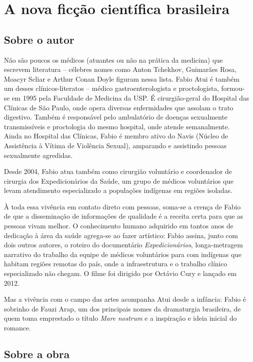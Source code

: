 \chapter{A nova ficção científica brasileira}

\section{Sobre o autor}


Não são poucos os médicos (atuantes ou não na prática da medicina) que escrevem literatura – célebres nomes como Anton Tchekhov, Guimarães Rosa, Moacyr Scliar e Arthur Conan Doyle figuram nessa lista. Fabio Atui é também um desses clínicos-literatos – médico gastroenterologista e proctologista, formou-se em 1995 pela Faculdade de Medicina da USP. É cirurgião-geral do Hospital das Clínicas de São Paulo, onde opera diversas enfermidades que assolam o trato digestivo. Também é responsável pelo ambulatório de doenças sexualmente transmissíveis e proctologia do mesmo hospital, onde atende semanalmente. Ainda no Hospital das Clínicas, Fabio é membro ativo do Navis (Núcleo de Assistência à Vítima de Violência Sexual), amparando e assistindo pessoas sexualmente agredidas.

Desde 2004, Fabio atua também como cirurgião voluntário e coordenador de cirurgia dos Expedicionários da Saúde, um grupo de médicos voluntários que levam atendimento especializado a populações indígenas em regiões isoladas. 

À toda essa vivência em contato direto com pessoas, soma-se a crença de Fabio de que a disseminação de informações de qualidade é a receita certa para que as pessoas vivam melhor. O conhecimento humano adquirido em tantos anos de dedicação à área da saúde agrega-se ao fazer artístico: Fabio assina, junto com dois outros autores, o roteiro do documentário \emph{Expedicionários}, longa-metragem narrativo do trabalho da equipe de médicos voluntários para com indígenas que habitam regiões remotas do país, onde a infraestrutura e o trabalho clínico especializado não chegam. O filme foi dirigido por Octávio Cury e lançado em 2012. 

Mas a vivência com o campo das artes acompanha Atui desde a infância: Fabio é sobrinho de Fauzi Arap, um dos principais nomes da dramaturgia brasileira, de quem toma emprestado o título \emph{Mare nostrum} e a inspiração e ideia inicial do romance.

\section{Sobre a obra}

